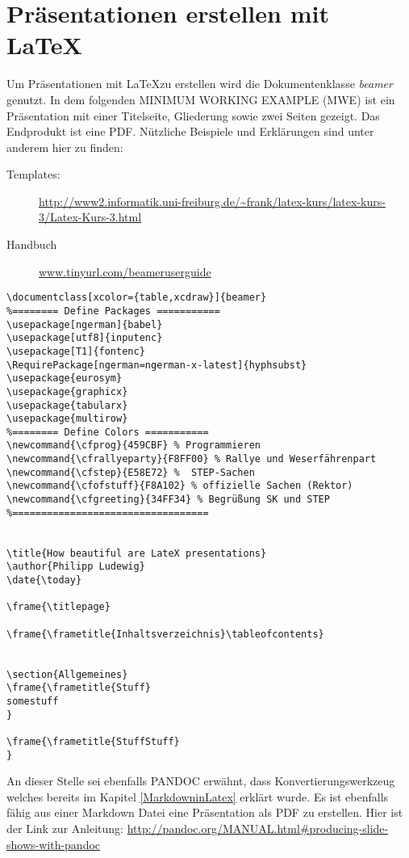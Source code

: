 \chapter{Präsentationen erstellen mit \LaTeX}
Um Präsentationen mit \LaTeX zu erstellen wird die Dokumentenklasse \emph{beamer} genutzt. In dem folgenden MINIMUM WORKING EXAMPLE (MWE) ist ein Präsentation mit einer Titelseite, Gliederung sowie zwei Seiten gezeigt. Das Endprodukt ist eine PDF. Nützliche Beispiele und Erklärungen sind unter anderem hier zu finden:
\begin{description}
	\item[Templates: ] \url{http://www2.informatik.uni-freiburg.de/~frank/latex-kurs/latex-kurs-3/Latex-Kurs-3.html}
	\item[Handbuch] \url{www.tinyurl.com/beameruserguide}
\end{description}
\begin{lstlisting}[style=LaTeX]
\documentclass[xcolor={table,xcdraw}]{beamer}
%======== Define Packages ===========
\usepackage[ngerman]{babel}
\usepackage[utf8]{inputenc}
\usepackage[T1]{fontenc}
\RequirePackage[ngerman=ngerman-x-latest]{hyphsubst}
\usepackage{eurosym}
\usepackage{graphicx} 
\usepackage{tabularx} 
\usepackage{multirow}
%======== Define Colors ===========
\newcommand{\cfprog}{459CBF} % Programmieren
\newcommand{\cfrallyeparty}{F8FF00} % Rallye und Weserfährenpart
\newcommand{\cfstep}{E58E72} %  STEP-Sachen 
\newcommand{\cfofstuff}{F8A102} % offizielle Sachen (Rektor)
\newcommand{\cfgreeting}{34FF34} % Begrüßung SK und STEP
%==================================	


\title{How beautiful are LateX presentations}   
\author{Philipp Ludewig} 
\date{\today} 

\frame{\titlepage} 

\frame{\frametitle{Inhaltsverzeichnis}\tableofcontents} 


\section{Allgemeines} 
\frame{\frametitle{Stuff} 
somestuff
}

\frame{\frametitle{StuffStuff}
}

\end{lstlisting}

An dieser Stelle sei ebenfalls PANDOC erwähnt, dass Konvertierungswerkzeug welches bereits im Kapitel \ref{MarkdowninLatex} erklärt wurde. Es ist ebenfalls fähig aus einer Markdown Datei eine Präsentation als PDF zu erstellen. Hier ist der Link zur Anleitung: \url{http://pandoc.org/MANUAL.html#producing-slide-shows-with-pandoc}

